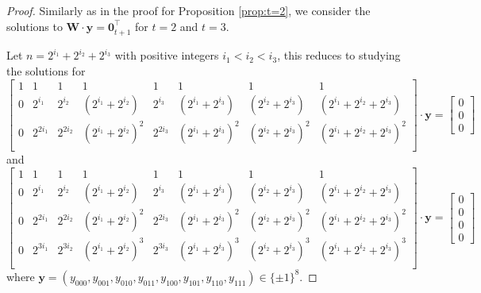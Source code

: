 \begin{proof}
    Similarly as in the proof for Proposition \ref{prop:t=2}, we consider the
    solutions to $\mathbf{W\cdot y = 0}^\intercal_{t+1}$ for $t=2$ and $t=3$.

    Let $n = 2^{i_1} + 2^{i_2} + 2^{i_3}$ with positive integers $i_1 < i_2 < i_3$, this reduces to studying the solutions for
    \begin{equation}\label{eq:vand_t=2}
        \begin{bmatrix}
            1 & 1 & 1 & 1 & 1 & 1 & 1 & 1\\
            0 &  2^{i_1} & 2^{i_2} & (2^{i_1} + 2^{i_2}) & 2^{i_3} & (2^{i_1} + 2^{i_3}) & (2^{i_2} + 2^{i_3}) & (2^{i_1} + 2^{i_2} + 2^{i_3})\\
            0 & 2^{2i_1} & 2^{2i_2} & (2^{i_1} + 2^{i_2})^2 & 2^{2i_3} & (2^{i_1} + 2^{i_3})^2 & (2^{i_2} + 2^{i_3})^2 & (2^{i_1} + 2^{i_2} + 2^{i_3})^2\\
        \end{bmatrix}
        \cdot \mathbf{y} = \begin{bmatrix}
            0\\0\\0
        \end{bmatrix}
    \end{equation}
    and
    \begin{equation}\label{eq:vand_t=3}
        \begin{bmatrix}
            1 & 1 & 1 & 1 & 1 & 1 & 1 & 1\\
            0 &  2^{i_1} & 2^{i_2} & (2^{i_1} + 2^{i_2}) & 2^{i_3} & (2^{i_1} + 2^{i_3}) & (2^{i_2} + 2^{i_3}) & (2^{i_1} + 2^{i_2} + 2^{i_3})\\
            0 & 2^{2i_1} & 2^{2i_2} & (2^{i_1} + 2^{i_2})^2 & 2^{2i_3} & (2^{i_1} + 2^{i_3})^2 & (2^{i_2} + 2^{i_3})^2 & (2^{i_1} + 2^{i_2} + 2^{i_3})^2\\
            0 & 2^{3i_1} & 2^{3i_2} & (2^{i_1} + 2^{i_2})^3 & 2^{3i_3} & (2^{i_1} + 2^{i_3})^3 & (2^{i_2} + 2^{i_3})^3 & (2^{i_1} + 2^{i_2} + 2^{i_3})^3\\
        \end{bmatrix}
        \cdot \mathbf{y} = \begin{bmatrix}
            0\\0\\0\\0
        \end{bmatrix}
    \end{equation}
    where $\mathbf{y} = (y_{000}, y_{001}, y_{010}, y_{011}, y_{100}, y_{101}, y_{110}, y_{111}) \in \{\pm1\}^8$.


\end{proof}
